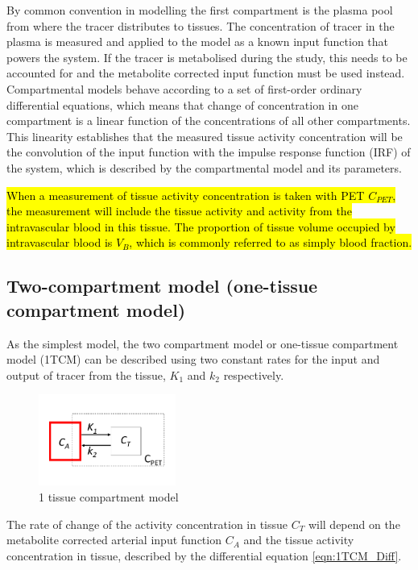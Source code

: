 By common convention in modelling the first compartment is the plasma pool from where the tracer distributes to tissues. The concentration of tracer in the plasma is measured and applied to the model as a known input function that powers the system. If the tracer is metabolised during the study, this needs to be accounted for and the metabolite corrected input function must be used instead. Compartmental models behave according to a set of first-order ordinary differential equations, which means that change of concentration in one compartment is a linear function of the concentrations of all other compartments. This linearity establishes that the measured tissue activity concentration will be the convolution of the input function with the impulse response function (IRF) of the system, which is described by the compartmental model and its parameters. \par
\hl{When a measurement of tissue activity concentration is taken with PET $C_{PET}$, the measurement will include the tissue activity and activity from the intravascular blood in this tissue. The proportion of tissue volume occupied by intravascular blood is $V_B$, which is commonly referred to as simply blood fraction.}\par

\subsection{Two-compartment model (one-tissue compartment model)}
As the simplest model, the two compartment model or one-tissue compartment model (1TCM) can be described using two constant rates for the input and output of tracer from the tissue, $K_1$ and $k_2$ respectively.

\begin{figure}[ht]
	\includegraphics[width=0.4\textwidth]{figures/1_1_1TCM.pdf}
	\centering
	\caption{1 tissue compartment model}
	\centering
	\label{fig:1TCM}
\end{figure}

The rate of change of the activity concentration in tissue $C_T$ will depend on the metabolite corrected arterial input function $C_A$ and the tissue activity concentration in tissue, described by the differential equation \ref{eqn:1TCM_Diff}.

